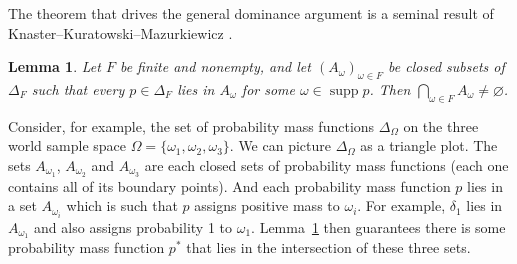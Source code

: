 \documentclass[11pt]{article}
\newtheorem{lemma}[theorem]{Lemma}
\theoremstyle{definition}
\theoremstyle{remark}
\newcommand{\supp}{\operatorname{supp}}
\begin{document}
The theorem that drives the general dominance argument is a seminal result of Knaster--Kuratowski--Mazurkiewicz {\cite{KKM1929}}.

\begin{lemma}\label{lem:kkm}
Let $F$ be finite and nonempty, and let $(A_\omega)_{\omega\in F}$ be closed subsets of $\Delta_F$ such that every $p\in\Delta_F$ lies in $A_\omega$ for some $\omega\in\supp p$. Then $\bigcap_{\omega\in F}A_\omega\ne\varnothing$.
\end{lemma}

Consider, for example, the set of probability mass functions $\Delta_\Omega$ on the three world sample space $\Omega=\{\omega_1,\omega_2,\omega_3\}$. We can picture $\Delta_\Omega$ as a triangle plot. The sets $A_{\omega_1}$, $A_{\omega_2}$ and $A_{\omega_3}$ are each closed sets of probability mass functions (each one contains all of its boundary points). And each probability mass function $p$ lies in a set $A_{\omega_i}$ which is such that $p$ assigns positive mass to $\omega_i$. For example, $\delta_1$ lies in $A_{\omega_1}$ and also assigns probability 1 to $\omega_1$. Lemma~\ref{lem:kkm} then guarantees there is some probability mass function $p^*$ that lies in the intersection of these three sets.
\end{document}

